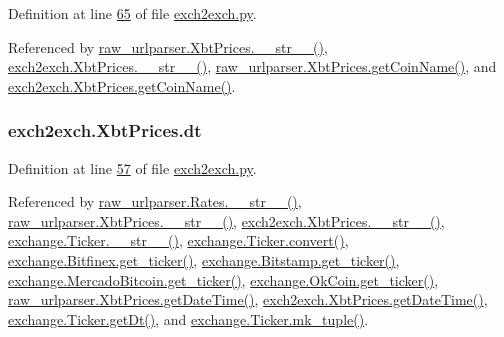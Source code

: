 Definition at line \hyperlink{exch2exch_8py_source_l00065}{65} of file \hyperlink{exch2exch_8py_source}{exch2exch.\+py}.



Referenced by \hyperlink{raw__urlparser_8py_source_l00074}{raw\+\_\+urlparser.\+Xbt\+Prices.\+\_\+\+\_\+str\+\_\+\+\_\+()}, \hyperlink{exch2exch_8py_source_l00091}{exch2exch.\+Xbt\+Prices.\+\_\+\+\_\+str\+\_\+\+\_\+()}, \hyperlink{raw__urlparser_8py_source_l00071}{raw\+\_\+urlparser.\+Xbt\+Prices.\+get\+Coin\+Name()}, and \hyperlink{exch2exch_8py_source_l00088}{exch2exch.\+Xbt\+Prices.\+get\+Coin\+Name()}.

\subsubsection[{\texorpdfstring{dt}{dt}}]{\setlength{\rightskip}{0pt plus 5cm}exch2exch.\+Xbt\+Prices.\+dt}\hypertarget{classexch2exch_1_1_xbt_prices_af9f916c683c48631c97f1c5d91447751}{}\label{classexch2exch_1_1_xbt_prices_af9f916c683c48631c97f1c5d91447751}


Definition at line \hyperlink{exch2exch_8py_source_l00057}{57} of file \hyperlink{exch2exch_8py_source}{exch2exch.\+py}.



Referenced by \hyperlink{raw__urlparser_8py_source_l00038}{raw\+\_\+urlparser.\+Rates.\+\_\+\+\_\+str\+\_\+\+\_\+()}, \hyperlink{raw__urlparser_8py_source_l00074}{raw\+\_\+urlparser.\+Xbt\+Prices.\+\_\+\+\_\+str\+\_\+\+\_\+()}, \hyperlink{exch2exch_8py_source_l00091}{exch2exch.\+Xbt\+Prices.\+\_\+\+\_\+str\+\_\+\+\_\+()}, \hyperlink{exchange_8py_source_l00111}{exchange.\+Ticker.\+\_\+\+\_\+str\+\_\+\+\_\+()}, \hyperlink{exchange_8py_source_l00065}{exchange.\+Ticker.\+convert()}, \hyperlink{exchange_8py_source_l00332}{exchange.\+Bitfinex.\+get\+\_\+ticker()}, \hyperlink{exchange_8py_source_l00401}{exchange.\+Bitstamp.\+get\+\_\+ticker()}, \hyperlink{exchange_8py_source_l00535}{exchange.\+Mercado\+Bitcoin.\+get\+\_\+ticker()}, \hyperlink{exchange_8py_source_l00600}{exchange.\+Ok\+Coin.\+get\+\_\+ticker()}, \hyperlink{raw__urlparser_8py_source_l00059}{raw\+\_\+urlparser.\+Xbt\+Prices.\+get\+Date\+Time()}, \hyperlink{exch2exch_8py_source_l00067}{exch2exch.\+Xbt\+Prices.\+get\+Date\+Time()}, \hyperlink{exchange_8py_source_l00093}{exchange.\+Ticker.\+get\+Dt()}, and \hyperlink{exchange_8py_source_l00096}{exchange.\+Ticker.\+mk\+\_\+tuple()}.

